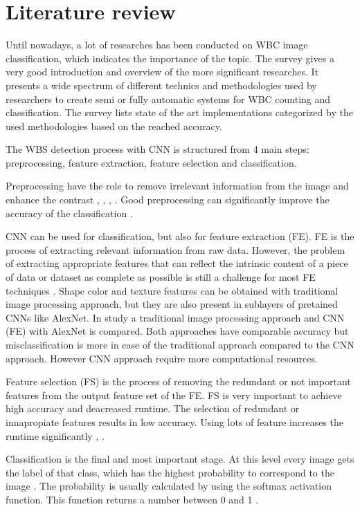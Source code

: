 \section{Literature review}
Until nowadays, a lot of researches has been conducted on WBC image classification, which indicates the importance of the topic.
The \cite{b7} survey gives a very good introduction and overview of the more significant researches. It presents a wide spectrum of different technics and methodologies used by researchers to create semi or fully automatic systems for WBC counting and classification. The survey lists state of the art implementations categorized by the used methodologies based on the reached accuracy.

The WBS detection process with CNN is structured from 4 main steps: preprocessing, feature extraction, feature selection and classification.

Preprocessing have the role to remove irrelevant information from the image and enhance the contrast \cite{b8}, \cite{b9}, \cite{b10}, \cite{b11}. Good preprocessing can significantly improve the accuracy of the classification \cite{b12}.

CNN can be used for classification, but also for feature extraction (FE). FE is the process of extracting relevant information from raw data. However, 
the problem of extracting appropriate features that can reflect the intrinsic content of a piece of data or dataset as complete as possible is still a challenge for most FE techniques \cite{b13}. 
Shape color and texture features can be obtained with traditional image processing approach, but they are also present in sublayers of pretained CNNs like AlexNet.
In \cite{b14} study a traditional image processing approach and CNN (FE) with AlexNet is compared. Both approaches have comparable accuracy but misclassification is 
more in case of the traditional approach compared to the CNN approach. However CNN approach require more computational resources.

Feature selection (FS) is the process of removing the redundant or not important features from the output feature set of the FE. FS is very important to achieve high accuracy and deacreased runtime. 
The selection of redundant or innapropiate features results in low accuracy. Using lots of feature increases the runtime significantly \cite{b15}, \cite{b16}.

Classification is the final and most important stage. At this level every image gets the label of that class, which has the highest probability to correspond to the image \cite{b17}. 
The probability is usually calculated by using the softmax activation function. This function returns a number between 0 and 1 \cite{b18}. 

